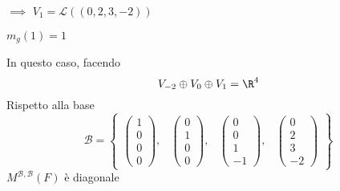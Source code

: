 {\begin{enumerate}
        $\implies$ $ V_1= \mathscr{L}((0, 2, 3, -2)) $

        $ m_{g}(1)=1  $
    \end{enumerate}

    In questo caso, facendo \[
        V_{-2}\oplus V_0\oplus V_1=\R^{4}
    \]
    Rispetto alla base \[
        \mathscr{B}=\begin{Bmatrix}
            \begin{pmatrix}
                1 \\ 0 \\ 0 \\ 0
            \end{pmatrix}, & \begin{pmatrix}
                0 \\ 1 \\ 0 \\ 0
            \end{pmatrix}, & \begin{pmatrix}
                0 \\ 0 \\ 1 \\ -1
            \end{pmatrix}, & \begin{pmatrix}
                0 \\ 2 \\ 3 \\  -2
            \end{pmatrix}
        \end{Bmatrix}
    \]
    $ M^{ \mathscr{B}, \mathscr{B}}(F) $ è diagonale
}


\osservazione{
}

